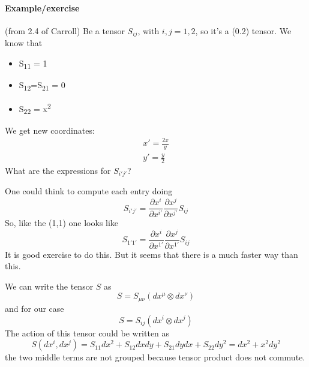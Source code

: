 \paragraph{Example/exercise} (from 2.4 of Carroll)
Be a tensor $S_{ij}$, with $i,j =1,2$, so it's a (0.2) tensor.
We know that
\begin{itemize}
	\item S\textsubscript{11} = 1
	\item S\textsubscript{12}=S\textsubscript{21} = 0
	\item S\textsubscript{22} = x\textsuperscript{2}
\end{itemize}
We get new coordinates:
\begin{gather*}
x' = \frac{2x}{y} \\
y' = \frac{y}{2}
\end{gather*}
What are the expressions for $S_{i'j'}$?\par
One could think to compute each entry doing
\[
S_{i'j'}= \frac{\partial x^{i}}{\partial x^{i'}} \frac{\partial x^{j}}{\partial x^{j'}} S_{ij}
\]
So, like the (1,1) one looks like
\[
S_{1'1'} = \frac{\partial x^{i}}{\partial x^{1'}} \frac{\partial x^{j}}{\partial x^{1'}} S_{ij}
\]
It is good exercise to do this.
But it seems that there is a much faster way than this.\par
We can write the tensor $S$ as
\[
S = S_{\mu \nu }\left( dx^{\mu } \otimes dx^{\nu } \right)
\]
and for our case 
\[
S = S_{ij}\left( dx^{i} \otimes dx^{j} \right)
\]
The action of this tensor could be written as 
\begin{equation}\label{eq:1}
S \left( dx^{i},dx^{j} \right) = S_{11}dx^{2} + S_{12}dxdy + S_{21}dydx + S_{22}dy^{2} = dx^{2} +x^{2}dy^{2}		
\end{equation}
the two middle terms are not grouped because tensor product does not commute.\par

